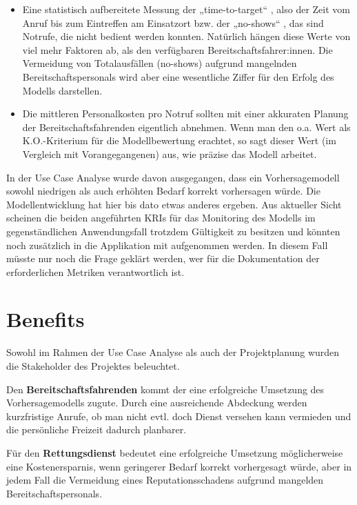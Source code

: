 \begin{itemize}
 \itemsep-8pt
 \item Eine statistisch aufbereitete Messung der „time-to-target“ , also der Zeit vom Anruf bis zum Eintreffen am Einsatzort bzw. der „no-shows“ , das sind Notrufe, die nicht bedient werden konnten. Natürlich hängen diese Werte von viel mehr Faktoren ab, als den verfügbaren Bereitschaftsfahrer:innen. Die Vermeidung von Totalausfällen (no-shows) aufgrund mangelnden Bereitschaftspersonals wird aber eine wesentliche Ziffer für den Erfolg des Modells darstellen.
 \item  Die mittleren Personalkosten pro Notruf sollten mit einer akkuraten Planung der Bereitschaftsfahrenden eigentlich abnehmen. Wenn man den o.a. Wert als K.O.-Kriterium für die Modellbewertung erachtet, so sagt dieser Wert (im Vergleich mit Vorangegangenen) aus, wie präzise das Modell arbeitet.
\end{itemize}

In der Use Case Analyse wurde davon ausgegangen, dass ein Vorhersagemodell sowohl niedrigen als auch erhöhten Bedarf korrekt vorhersagen würde. Die Modellentwicklung hat hier bis dato etwas anderes ergeben. Aus aktueller Sicht scheinen die beiden angeführten KRIs  für das Monitoring des Modells im gegenständlichen Anwendungsfall trotzdem Gültigkeit zu besitzen und könnten noch zusätzlich in die Applikation mit aufgenommen werden. In diesem Fall müsste nur noch die Frage geklärt werden, wer für die Dokumentation der erforderlichen Metriken verantwortlich ist.


\section{Benefits}
\label{ca}
Sowohl im Rahmen der Use Case Analyse \citep{grunsky_rettungsdienst_2024} als auch der Projektplanung \citep{grunsky_rettungsdienst_2025} wurden die Stakeholder des Projektes beleuchtet.  

Den \textbf{Bereitschaftsfahrenden} kommt der eine erfolgreiche Umsetzung des Vorhersagemodells zugute. Durch eine ausreichende Abdeckung werden kurzfristige Anrufe, ob man nicht evtl. doch Dienst versehen kann vermieden und die persönliche Freizeit dadurch planbarer. 

Für den \textbf{Rettungsdienst} bedeutet eine erfolgreiche Umsetzung möglicherweise eine Kostenersparnis, wenn geringerer Bedarf korrekt vorhergesagt würde, aber in jedem Fall die Vermeidung eines Reputationsschadens aufgrund mangelden Bereitschaftspersonals.

